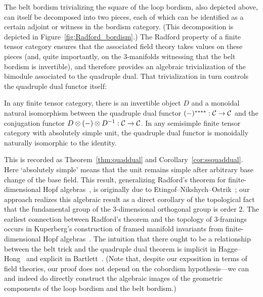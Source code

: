 \documentclass{amsart}
\begin{document}
The belt bordism trivializing the square of the loop bordism, also depicted above, can itself be decomposed into two pieces, each of which can be identified as a certain adjoint or witness in the bordism category.  (This decomposition is depicted in Figure~\ref{fig:Radford_bordism}.)  The Radford property of a finite tensor category ensures that the associated field theory takes values on these pieces (and, quite importantly, on the 3-manifolds witnessing that the belt bordism is invertible), and therefore provides an algebraic trivialization of the bimodule associated to the quadruple dual.  That trivialization in turn controls the quadruple dual functor itself:
\begin{maincor} \label{cor7}
In any finite tensor category, there is an invertible object $D$ and a monoidal natural isomorphism between the quadruple dual functor $(-)^{****}: \mathcal C \rightarrow \mathcal C$ and the conjugation functor $D \otimes (-) \otimes D^{-1}: \mathcal C \rightarrow \mathcal C$.  In any semisimple finite tensor category with absolutely simple unit, the quadruple dual functor is monoidally naturally isomorphic to the identity.
\end{maincor}
\nid This is recorded as Theorem~\ref{thm:quaddual} and Corollary~\ref{cor:ssquaddual}.  Here `absolutely simple' means that the unit remains simple after arbitrary base change of the base field.  This result, generalizing Radford's theorem for finite-dimensional Hopf algebras~\cite{MR0407069}, is originally due to Etingof--Nikshych--Ostrik~\cite{MR2097289, MR2183279}; our approach realizes this algebraic result as a direct corollary of the topological fact that the fundamental group of the 3-dimensional orthogonal group is order 2.  The earliest connection between Radford's theorem and the topology of 3-framings occurs in Kuperberg's construction of framed manifold invariants from finite-dimensional Hopf algebras~\cite{MR1394749}.  The intuition that there ought to be a relationship between the belt trick and the quadruple dual theorem is implicit in Hagge--Hong~\cite{MR2559711} and explicit in Bartlett~\cite{0901.3975}.  (Note that, despite our exposition in terms of field theories, our proof does not depend on the cobordism hypothesis---we can and indeed do directly construct the algebraic images of the geometric components of the loop bordism and the belt bordism.)
\end{document}
